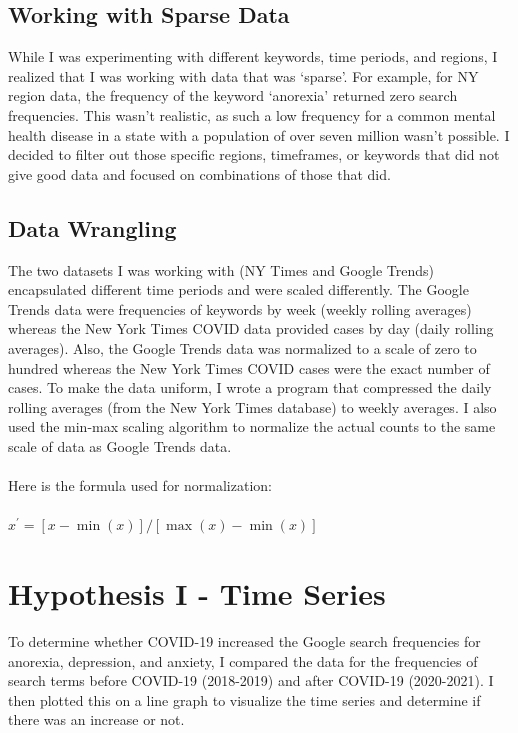 \documentclass{article}
\begin{document}
\subsection{Working with Sparse Data}

While I was experimenting with different keywords, time periods, and regions, I realized that I was
working with data that was ‘sparse’. For example, for NY region data, the frequency of the
keyword ‘anorexia’ returned zero search frequencies. This wasn’t realistic, as such a low
frequency for a common mental health disease in a state with a population of over seven million
wasn’t possible. I decided to filter out those specific regions, timeframes, or keywords that did not
give good data and focused on combinations of those that did.

\subsection{Data Wrangling}

The two datasets I was working with (NY Times and Google Trends) encapsulated different time
periods and were scaled differently. The Google Trends data were frequencies of keywords by week (weekly rolling averages) whereas the New York Times COVID data provided cases by day (daily rolling averages). Also, the Google Trends data was normalized to a scale of zero to
hundred whereas the New York Times COVID cases were the exact number of cases. To make
the data uniform, I wrote a program that compressed the daily rolling averages (from the New
York Times database) to weekly averages. I also used the min-max scaling algorithm to normalize
the actual counts to the same scale of data as Google Trends data.
\\
\\
\noindent Here is the formula used for normalization: \\
\\
\noindent $x^{\prime}=[x-\min (x)] /[\max (x)-\min (x)]$


\section{Hypothesis I - Time Series}

To determine whether COVID-19 increased the Google search frequencies for anorexia, depression,
and anxiety, I compared the data for the frequencies of search terms before COVID-19 (2018-2019)
and after COVID-19 (2020-2021). I then plotted this on a line graph to visualize the time series and
determine if there was an increase or not.
\end{document}
